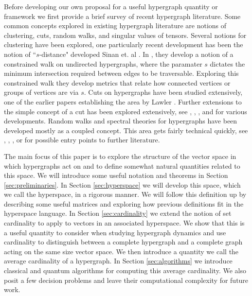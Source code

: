 \documentclass{article}
\begin{document}
Before developing our own proposal for a useful hypergraph quantity or framework \cite{xkcd} we first provide a brief survey of recent hypergraph literature. Some common concepts explored in existing hypergraph literature are notions of clustering, cuts, random walks, and singular values of tensors.
Several notions for clustering have been explored, one particularly recent development has been the notion of ``$s$-distance" developed Sinan et. al \cite{sinanPNNL}. In \cite{sinanPNNL}, they develop a notion of a constrained walk on undirected hypergraphs, where the paramater $s$ dictates the minimum intersection required between edges to be traversable. Exploring this constrained walk they develop metrics that relate how connected vertices or groups of vertices are via $s$. Cuts on hypergraphs have been studied extensively, one of the earlier papers establishing the area by Lawler \cite{lawler_cutsets_1973}. Further extensions to the simple concept of a cut has been explored extensively, see \cite{veldt_hypergraph_2020}, \cite{rafaellaCheeger}, \cite{ageev_approximation_nodate}, and \cite{conlon_hypergraph_2019} for various developments. Random walks and spectral theories for hypergraphs have been developed mostly as a coupled concept. This area gets fairly technical quickly, see \cite{rough_spectral_tensors}, \cite{sinan_random_walks_laplacians_clustering}, \cite{jost_hypergraph_2018}, or \cite{mulas_random_2021} for possible entry points to further literature.

The main focus of this paper is to explore the structure of the vector space in which hypergraphs act on and to define somewhat natural quantities related to this space. We will introduce some useful notation and theorems in Section \ref{sec:preliminaries}. In Section \ref{sec:hyperspace} we will develop this space, which we call the hyperspace, in a rigorous manner. We will follow this definition up by describing some useful matrices and exploring how previous definitions fit in the hyperspace language. In Section \ref{sec:cardinality} we extend the notion of set cardinality to apply to vectors in an associated hyperspace. We show that this is a useful quantity to consider when studying hypergraph dynamics and use cardinality to distinguish between a complete hypergraph and a complete graph acting on the same size vector space. We then introduce a quantity we call the average cardinality of a hypergraph.
In Section \ref{sec:algorithms} we introduce classical and quantum algorithms for computing this average cardinality. We also posit a few decision problems and leave their computational complexity for future work.
\end{document}
